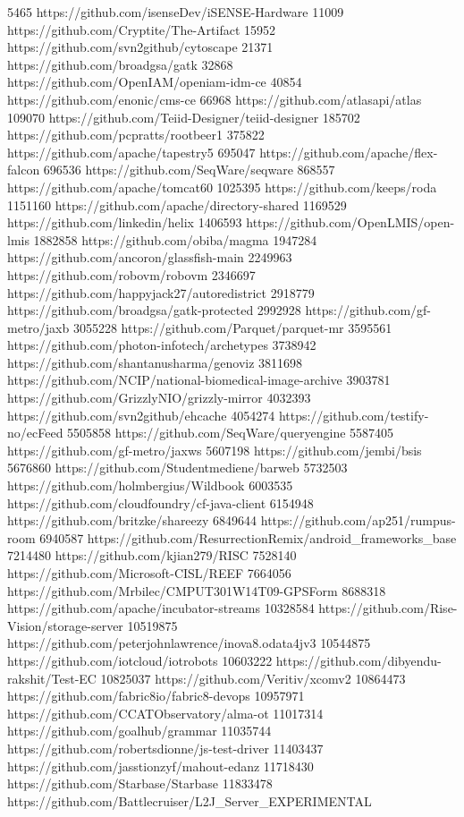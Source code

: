 5465	https://github.com/isenseDev/iSENSE-Hardware
11009	https://github.com/Cryptite/The-Artifact
15952	https://github.com/svn2github/cytoscape
21371	https://github.com/broadgsa/gatk
32868	https://github.com/OpenIAM/openiam-idm-ce
40854	https://github.com/enonic/cms-ce
66968	https://github.com/atlasapi/atlas
109070	https://github.com/Teiid-Designer/teiid-designer
185702	https://github.com/pcpratts/rootbeer1
375822	https://github.com/apache/tapestry5
695047	https://github.com/apache/flex-falcon
696536	https://github.com/SeqWare/seqware
868557	https://github.com/apache/tomcat60
1025395	https://github.com/keeps/roda
1151160	https://github.com/apache/directory-shared
1169529	https://github.com/linkedin/helix
1406593	https://github.com/OpenLMIS/open-lmis
1882858	https://github.com/obiba/magma
1947284	https://github.com/ancoron/glassfish-main
2249963	https://github.com/robovm/robovm
2346697	https://github.com/happyjack27/autoredistrict
2918779	https://github.com/broadgsa/gatk-protected
2992928	https://github.com/gf-metro/jaxb
3055228	https://github.com/Parquet/parquet-mr
3595561	https://github.com/photon-infotech/archetypes
3738942	https://github.com/shantanusharma/genoviz
3811698	https://github.com/NCIP/national-biomedical-image-archive
3903781	https://github.com/GrizzlyNIO/grizzly-mirror
4032393	https://github.com/svn2github/ehcache
4054274	https://github.com/testify-no/ecFeed
5505858	https://github.com/SeqWare/queryengine
5587405	https://github.com/gf-metro/jaxws
5607198	https://github.com/jembi/bsis
5676860	https://github.com/Studentmediene/barweb
5732503	https://github.com/holmbergius/Wildbook
6003535	https://github.com/cloudfoundry/cf-java-client
6154948	https://github.com/britzke/shareezy
6849644	https://github.com/ap251/rumpus-room
6940587	https://github.com/ResurrectionRemix/android_frameworks_base
7214480	https://github.com/kjian279/RISC
7528140	https://github.com/Microsoft-CISL/REEF
7664056	https://github.com/Mrbilec/CMPUT301W14T09-GPSForm
8688318	https://github.com/apache/incubator-streams
10328584	https://github.com/Rise-Vision/storage-server
10519875	https://github.com/peterjohnlawrence/inova8.odata4jv3
10544875	https://github.com/iotcloud/iotrobots
10603222	https://github.com/dibyendu-rakshit/Test-EC
10825037	https://github.com/Veritiv/xcomv2
10864473	https://github.com/fabric8io/fabric8-devops
10957971	https://github.com/CCATObservatory/alma-ot
11017314	https://github.com/goalhub/grammar
11035744	https://github.com/robertsdionne/js-test-driver
11403437	https://github.com/jasstionzyf/mahout-edanz
11718430	https://github.com/Starbase/Starbase
11833478	https://github.com/Battlecruiser/L2J_Server_EXPERIMENTAL
